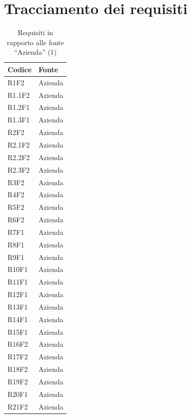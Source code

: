 	\section{Tracciamento dei requisiti}

	\begin{table}[H]
		{\def\arraystretch{1.5}
		\begin{tabularx}{\textwidth}{XX}
			\rowcolor{beautyblue}
			\textbf{Codice} &
			\textbf{Fonte} \\ \hline
			R1F2 & Azienda \\
			R1.1F2 & Azienda \\
			R1.2F1 & Azienda \\
			R1.3F1 & Azienda \\
			R2F2 & Azienda \\
			R2.1F2 & Azienda \\
			R2.2F2 & Azienda \\
			R2.3F2 & Azienda \\
			R3F2 & Azienda \\
			R4F2 & Azienda \\
			R5F2 & Azienda \\
			R6F2 & Azienda \\
			R7F1 & Azienda \\
			R8F1 & Azienda \\
			R9F1 & Azienda \\
			R10F1 & Azienda \\
			R11F1 & Azienda \\
			R12F1 & Azienda \\
			R13F1 & Azienda \\
			R14F1 & Azienda \\
			R15F1 & Azienda \\
			R16F2 & Azienda \\
			R17F2 & Azienda \\
			R18F2 & Azienda \\
			R19F2 & Azienda \\
			R20F1 & Azienda \\
			R21F2 & Azienda \\

			\bottomrule
		\end{tabularx}} 
	\caption{Requisiti in rapporto alle fonte ``Azienda'' (1)}
	\end{table}

